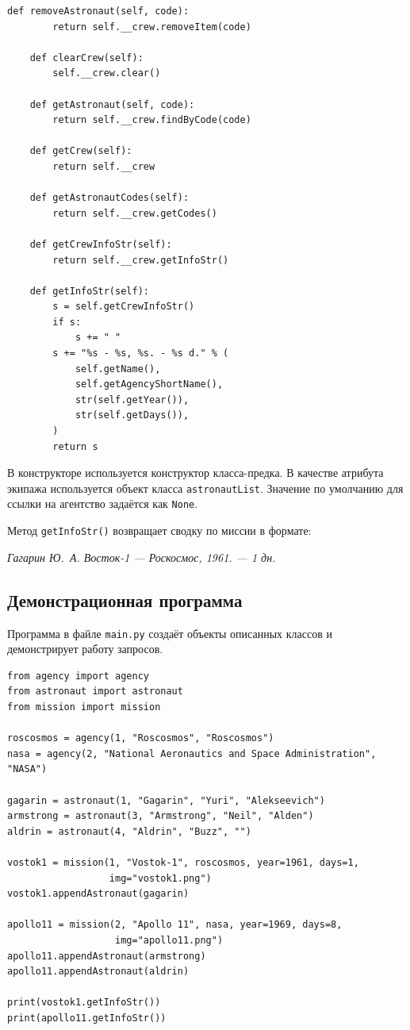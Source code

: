 \documentclass[a4paper,14pt]{extarticle}
\begin{document}
\begin{lstlisting}[caption={Модуль \texttt{mission.py}}]
    def removeAstronaut(self, code):
        return self.__crew.removeItem(code)

    def clearCrew(self):
        self.__crew.clear()

    def getAstronaut(self, code):
        return self.__crew.findByCode(code)

    def getCrew(self):
        return self.__crew

    def getAstronautCodes(self):
        return self.__crew.getCodes()

    def getCrewInfoStr(self):
        return self.__crew.getInfoStr()

    def getInfoStr(self):
        s = self.getCrewInfoStr()
        if s:
            s += " "
        s += "%s - %s, %s. - %s d." % (
            self.getName(),
            self.getAgencyShortName(),
            str(self.getYear()),
            str(self.getDays()),
        )
        return s
\end{lstlisting}

В конструкторе используется конструктор класса-предка. В качестве атрибута экипажа используется объект класса \texttt{astronautList}. Значение по умолчанию для ссылки на агентство задаётся как \texttt{None}.

Метод \texttt{getInfoStr()} возвращает сводку по миссии в формате:
\begin{center}
\textit{Гагарин Ю.~А. Восток-1 --- Роскосмос, 1961. --- 1 дн.}
\end{center}

\subsection{Демонстрационная программа}

Программа в файле \texttt{main.py} создаёт объекты описанных классов и демонстрирует работу запросов.

\begin{lstlisting}[caption={Фрагмент модуля \texttt{main.py}: создание объектов}]
from agency import agency
from astronaut import astronaut
from mission import mission

roscosmos = agency(1, "Roscosmos", "Roscosmos")
nasa = agency(2, "National Aeronautics and Space Administration", "NASA")

gagarin = astronaut(1, "Gagarin", "Yuri", "Alekseevich")
armstrong = astronaut(3, "Armstrong", "Neil", "Alden")
aldrin = astronaut(4, "Aldrin", "Buzz", "")

vostok1 = mission(1, "Vostok-1", roscosmos, year=1961, days=1,
                  img="vostok1.png")
vostok1.appendAstronaut(gagarin)

apollo11 = mission(2, "Apollo 11", nasa, year=1969, days=8,
                   img="apollo11.png")
apollo11.appendAstronaut(armstrong)
apollo11.appendAstronaut(aldrin)

print(vostok1.getInfoStr())
print(apollo11.getInfoStr())
\end{lstlisting}
\end{document}
